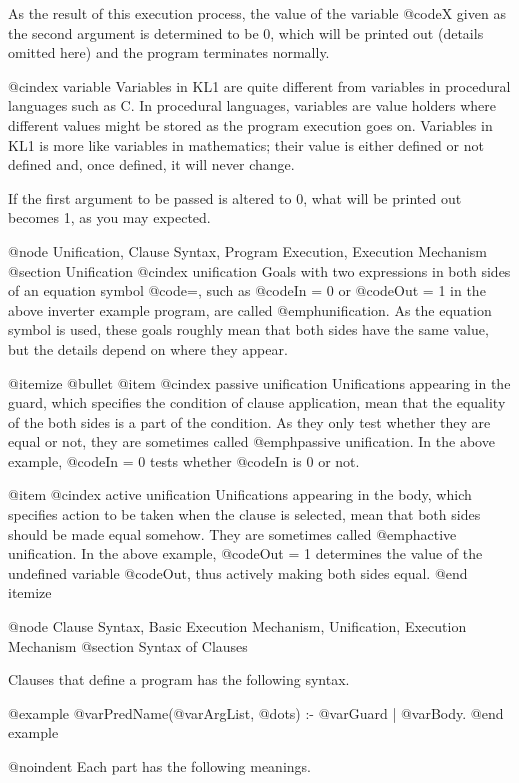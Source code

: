 As the result of this execution process, the value of the variable
@code{X} given as the second argument is determined to be 0, which will
be printed out (details omitted here) and the program terminates
normally.

@cindex variable
Variables in KL1 are quite different from variables in procedural
languages such as C.  In procedural languages, variables are value
holders where different values might be stored as the program execution
goes on.  Variables in KL1 is more like variables in mathematics; their
value is either defined or not defined and, once defined, it will never
change.

If the first argument to be passed is altered to 0, what will be printed
out becomes 1, as you may expected.

@node Unification, Clause Syntax, Program Execution, Execution Mechanism
@section Unification
@cindex unification
Goals with two expressions in both sides of an equation symbol @code{=},
such as @code{In = 0} or @code{Out = 1} in the above inverter example
program, are called @emph{unification}.  As the equation symbol is used,
these goals roughly mean that both sides have the same value, but the
details depend on where they appear.

@itemize @bullet
@item
@cindex passive unification
Unifications appearing in the guard, which specifies the condition of
clause application, mean that the equality of the both sides is a part
of the condition.  As they only test whether they are equal or not, they
are sometimes called @emph{passive unification}.  In the above example,
@code{In = 0} tests whether @code{In} is 0 or not.

@item
@cindex active unification
Unifications appearing in the body, which specifies action to be taken
when the clause is selected, mean that both sides should be made equal
somehow.  They are sometimes called @emph{active unification}.  In the
above example, @code{Out = 1} determines the value of the undefined
variable @code{Out}, thus actively making both sides equal.
@end itemize

@node Clause Syntax, Basic Execution Mechanism, Unification, Execution Mechanism
@section Syntax of Clauses

Clauses that define a program has the following syntax.

@example
@var{PredName}(@var{ArgList}, @dots{}) :- @var{Guard} | @var{Body}.
@end example

@noindent
Each part has the following meanings.

